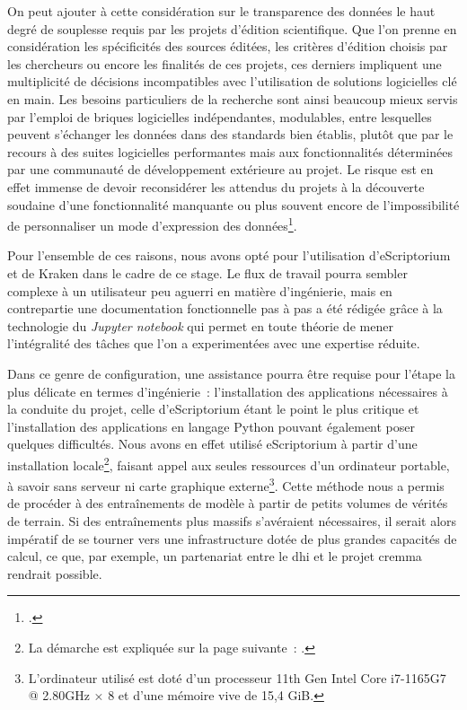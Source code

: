 \documentclass[a4paper,12pt,twoside]{book}
\begin{document}
				On peut ajouter à cette considération sur le transparence des données le haut degré de souplesse requis par les projets d'édition scientifique. Que l'on prenne en considération les spécificités des sources éditées, les critères d'édition choisis par les chercheurs ou encore les finalités de ces projets, ces derniers impliquent une multiplicité de décisions incompatibles avec l'utilisation de solutions logicielles clé en main. Les besoins particuliers de la recherche sont ainsi beaucoup mieux servis par l'emploi de briques logicielles indépendantes, modulables, entre lesquelles peuvent s'échanger les données dans des standards bien établis, plutôt que par le recours à des suites logicielles performantes mais aux fonctionnalités déterminées par une communauté de développement extérieure au projet. Le risque est en effet immense de devoir reconsidérer les attendus du projets à la découverte soudaine d'une fonctionnalité manquante ou plus souvent encore de l'impossibilité de personnaliser un mode d'expression des données\footcite{stokesEScriptoriumVREManuscript2021}.
				
				Pour l'ensemble de ces raisons, nous avons opté pour l'utilisation d'eScriptorium et de Kraken dans le cadre de ce stage. Le flux de travail pourra sembler complexe à un utilisateur peu aguerri en matière d'ingénierie, mais en contrepartie une documentation fonctionnelle pas à pas a été rédigée grâce à la technologie du \textit{Jupyter notebook} qui permet en toute théorie de mener l'intégralité des tâches que l'on a experimentées avec une expertise réduite.
							
				Dans ce genre de configuration, une assistance pourra être requise pour l'étape la plus délicate en termes d'ingénierie~: l'installation des applications nécessaires à la conduite du projet, celle d'eScriptorium étant le point le plus critique et l'installation des applications en langage Python pouvant également poser quelques difficultés. Nous avons en effet utilisé eScriptorium à partir d'une installation locale\footnote{La démarche est expliquée sur la page suivante~: \cite{DockerInstallInstallation}.}, faisant appel aux seules ressources d'un ordinateur portable, à savoir sans serveur ni carte graphique externe\footnote{L'ordinateur utilisé est doté d'un processeur 11th Gen Intel Core i7-1165G7 @ 2.80GHz × 8 et d'une mémoire vive de 15,4 GiB.}. Cette méthode nous a permis de procéder à des entraînements de modèle à partir de petits volumes de vérités de terrain. Si des entraînements plus massifs s'avéraient nécessaires, il serait alors impératif de se tourner vers une infrastructure dotée de plus grandes capacités de calcul, ce que, par exemple, un partenariat entre le \gls{dhi} et le projet \gls{cremma} rendrait possible.
						
\end{document}

